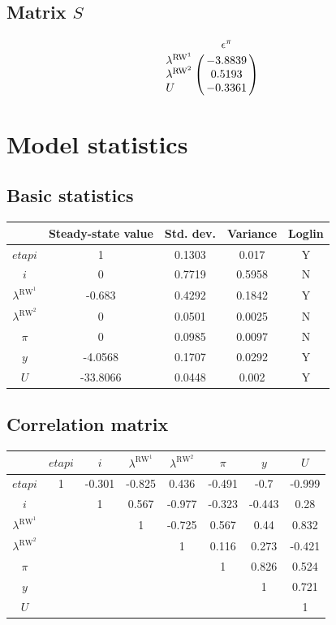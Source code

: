 \subsection*{Matrix $S$}

$$\bordermatrix{
~ & \epsilon^{\pi} \cr
\lambda^{\mathrm{RW}^{\mathrm{1}}} & -3.8839 \cr
\lambda^{\mathrm{RW}^{\mathrm{2}}} & 0.5193 \cr
U & -0.3361 \cr
}$$


\section{Model statistics}

\subsection{Basic statistics}

\begin{tabular}{c|c|c|c|c|}
  & Steady-state value & Std. dev. & Variance & Loglin\\
\hline
${e\!t\!a\!p\!i}$ & 1 & 0.1303 & 0.017 & Y    \\
$i$ & 0 & 0.7719 & 0.5958 & N    \\
$\lambda^{\mathrm{RW}^{\mathrm{1}}}$ & -0.683 & 0.4292 & 0.1842 & Y    \\
$\lambda^{\mathrm{RW}^{\mathrm{2}}}$ & 0 & 0.0501 & 0.0025 & N    \\
$\pi$ & 0 & 0.0985 & 0.0097 & N    \\
$y$ & -4.0568 & 0.1707 & 0.0292 & Y    \\
$U$ & -33.8066 & 0.0448 & 0.002 & Y    \\
\hline
\end{tabular}


\subsection{Correlation matrix}

\begin{tabular}{c|ccccccc|}
  & ${e\!t\!a\!p\!i}$ & $i$ & $\lambda^{\mathrm{RW}^{\mathrm{1}}}$ & $\lambda^{\mathrm{RW}^{\mathrm{2}}}$ & $\pi$ & $y$ & $U$\\
\hline
${e\!t\!a\!p\!i}$ & 1 & -0.301 & -0.825 & 0.436 & -0.491 & -0.7 & -0.999 \\
$i$ &  & 1 & 0.567 & -0.977 & -0.323 & -0.443 & 0.28 \\
$\lambda^{\mathrm{RW}^{\mathrm{1}}}$ &  &  & 1 & -0.725 & 0.567 & 0.44 & 0.832 \\
$\lambda^{\mathrm{RW}^{\mathrm{2}}}$ &  &  &  & 1 & 0.116 & 0.273 & -0.421 \\
$\pi$ &  &  &  &  & 1 & 0.826 & 0.524 \\
$y$ &  &  &  &  &  & 1 & 0.721 \\
$U$ &  &  &  &  &  &  & 1 \\
\hline
\end{tabular}


